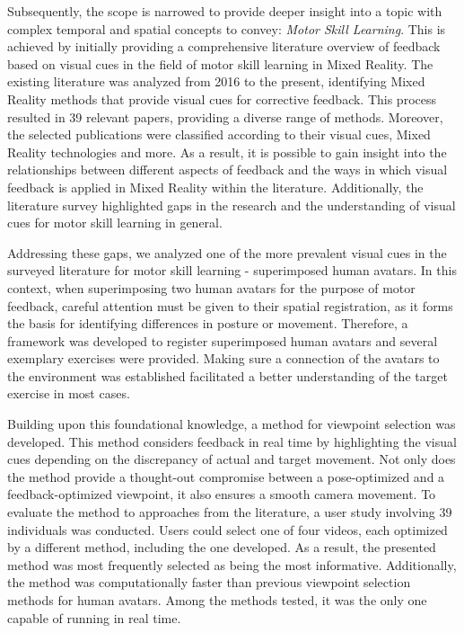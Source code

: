 Subsequently, the scope is narrowed to provide deeper insight into a topic with complex temporal and spatial concepts to convey: \emph{Motor Skill Learning}.
This is achieved by initially providing a comprehensive literature overview of feedback based on visual cues in the field of motor skill learning in Mixed Reality.
The existing literature was analyzed from 2016 to the present, identifying Mixed Reality methods that provide visual cues for corrective feedback.
This process resulted in 39 relevant papers, providing a diverse range of methods.
Moreover, the selected publications were classified according to their visual cues, Mixed Reality technologies and more.
As a result, it is possible to gain insight into the relationships between different aspects of feedback and the ways in which visual feedback is applied in Mixed Reality within the literature.
Additionally, the literature survey highlighted gaps in the research and the understanding of visual cues for motor skill learning in general.

Addressing these gaps, we analyzed one of the more prevalent visual cues in the surveyed literature for motor skill learning - superimposed human avatars.
In this context, when superimposing two human avatars for the purpose of motor feedback, careful attention must be given to their spatial registration, as it forms the basis for identifying differences in posture or movement.
Therefore, a framework was developed to register superimposed human avatars and several exemplary exercises were provided.
Making sure a connection of the avatars to the environment was established facilitated a better understanding of the target exercise in most cases.

Building upon this foundational knowledge, a method for viewpoint selection was developed.
This method considers feedback in real time by highlighting the visual cues depending on the discrepancy of actual and target movement.
Not only does the method provide a thought-out compromise between a pose-optimized and a feedback-optimized viewpoint, it also ensures a smooth camera movement.
To evaluate the method to approaches from the literature, a user study involving 39 individuals was conducted.
Users could select one of four videos, each optimized by a different method, including the one developed.
As a result, the presented method was most frequently selected as being the most informative.
Additionally, the method was computationally faster than previous viewpoint selection methods for human avatars.
Among the methods tested, it was the only one capable of running in real time.

